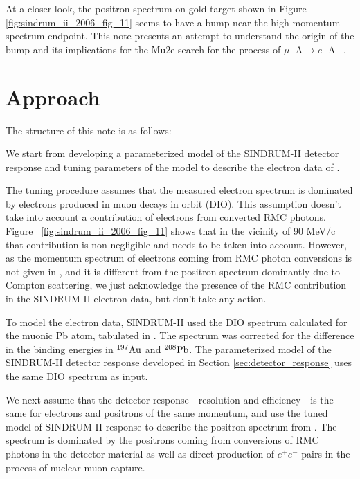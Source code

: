 \documentclass[12pt]{article}
\newcommand {\mumepconv}[1][A] {%
  \def\ArgI{{#1}}%
  \mumepconvRelay
}
\newcommand \mumepconvRelay[1][A]  {\mbox{$\mu^- \textrm{\ArgI} \rightarrow e^+ \textrm{#1}$}}
\newcommand {\Pb}[1]     {\mbox{$\rm ^{#1}Pb$}}                 %
\newcommand {\Au}[1]     {\mbox{$\rm ^{#1}Au$}}                 %
\begin{document}
At a closer look, the positron spectrum on gold target
shown in Figure \ref{fig:sindrum_ii_2006_fig_11} seems to have a bump
near the high-momentum spectrum endpoint. 
This note presents an attempt to understand the origin of the bump
and its implications for the Mu2e search for the process of \mumepconv\ .

\newpage
\section { Approach}

The structure of this note is as follows:


We start from developing a parameterized model of the SINDRUM-II detector response
and tuning parameters of the model to describe the electron data of \cite{sindrum_ii:Bertl2006}. 


The tuning procedure assumes that the measured electron spectrum is dominated
by electrons produced in muon decays in orbit (DIO). This assumption
doesn't take into account a contribution of electrons from converted RMC photons. 
Figure ~\ref{fig:sindrum_ii_2006_fig_11} shows that in the vicinity of 90 MeV/c
that contribution is non-negligible and needs to be taken into account.
However, as the momentum spectrum of electrons coming from RMC photon
conversions is not given in \cite{sindrum_ii:Bertl2006}, and it is different
from the positron spectrum dominantly due to Compton scattering,
we just acknowledge the presence of the RMC contribution in the SINDRUM-II
electron data, but don't take any action. 

To model the electron data, SINDRUM-II used the DIO spectrum calculated
for the muonic Pb atom, tabulated in \cite{Watanabe_1993}. The spectrum was
corrected for the difference in the binding energies in \Au{197} and \Pb{208}.
The parameterized model of the SINDRUM-II detector response developed in Section
\ref{sec:detector_response} uses the same DIO spectrum as input. 

We next assume that the detector response - resolution and efficiency - 
is the same for electrons and positrons of the same momentum,
and use the tuned model of SINDRUM-II response to describe the positron spectrum
from \cite{sindrum_ii:Bertl2006}. The spectrum is dominated by the positrons 
coming from conversions of RMC photons in the detector material as well as
direct production of $e^+e^-$ pairs in the process of nuclear muon capture.
\end{document}
